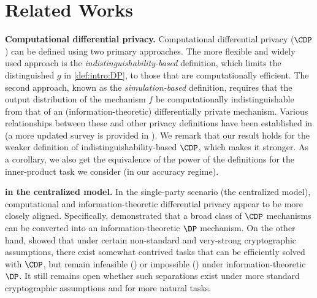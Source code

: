 \section{Related Works}
\label{sec:related-works}

\textbf{Computational differential privacy.} Computational differential privacy ($\CDP$) can be defined using two primary approaches.
The more flexible and widely used approach is the \emph{indistinguishability-based} definition, which limits the distinguished $g$ in \cref{def:intro:DP}, to those that are computationally efficient. The second approach, known as the \emph{simulation-based} definition, requires that the output distribution of the mechanism $f$ be computationally indistinguishable from that of an (information-theoretic) differentially private mechanism. Various relationships between these and other privacy definitions have been established in \cite{MPRV09} (a more updated survey is provided in \cite{MeisingsethR25}). We remark that our result holds for the weaker definition of indistinguishability-based $\CDP$, which makes it stronger. As a corollary, we also get the equivalence of the power of the definitions for the inner-product task we consider (in our accuracy regime).

\textbf{\CDP in the centralized model.} In the single-party scenario (\ie the centralized model), computational and information-theoretic differential privacy appear to be more closely aligned. Specifically, \cite{GKY11} demonstrated that a broad class of $\CDP$ mechanisms can be converted into an information-theoretic $\DP$ mechanism. On the other hand, \cite{BunCV16,GhaziIK0M23} showed that under certain non-standard and very-strong cryptographic assumptions, there exist somewhat contrived tasks that can be efficiently solved with $\CDP$, but remain infeasible (\cite{BunCV16}) or impossible (\cite{GhaziIK0M23}) under information-theoretic $\DP$. It still remains open whether such separations exist under more standard cryptographic assumptions and for more natural tasks.


